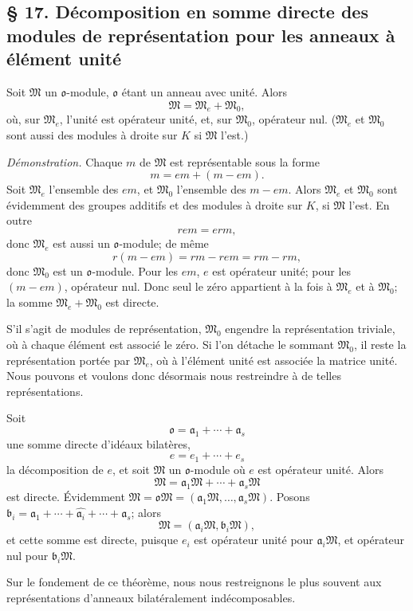 
\providecommand{\mo}{\mathfrak{o}}
\providecommand{\mM}{\mathfrak{M}}
\providecommand{\ma}{\mathfrak{a}}
\providecommand{\mb}{\mathfrak{b}}

\subsection*{\S{} 17. Décomposition en somme directe des modules de représentation pour les anneaux à élément unité}
Soit $\mM$ un $\mo$-module, $\mo$ étant un anneau avec unité. Alors
\[
        \mM=\mM_e+\mM_0,
\]
où, sur $\mM_e$, l'unité est opérateur unité, et, sur $\mM_0$, opérateur nul. ($\mM_e$ et $\mM_0$ sont aussi des modules à droite sur $K$ si $\mM$ l'est.)

\emph{Démonstration.} Chaque $m$ de $\mM$ est représentable sous la forme
\[
        m=em+(m-em).
\]
Soit $\mM_e$ l'ensemble des $em$, et $\mM_0$ l'ensemble des $m-em$. Alors $\mM_e$ et $\mM_0$ sont évidemment des groupes additifs et des modules à droite sur $K$, si $\mM$ l'est. En outre
\[
        r em=erm,
\]
donc $\mM_e$ est aussi un $\mo$-module; de même
\[
        r(m-em)=rm-rem=rm-rm,
\]
donc $\mM_0$ est un $\mo$-module. Pour les $em$, $e$ est opérateur unité; pour les $(m-em)$, opérateur nul. Donc seul le zéro appartient à la fois à $\mM_e$ et à $\mM_0$; la somme $\mM_e+\mM_0$ est directe.

S'il s'agit de modules de représentation, $\mM_0$ engendre la représentation triviale, où à chaque élément est associé le zéro. Si l'on détache le sommant $\mM_0$, il reste la représentation portée par $\mM_e$, où à l'élément unité est associée la matrice unité. Nous pouvons et voulons donc désormais nous restreindre à de telles représentations.

Soit
\[
        \mo=\ma_1+\cdots+\ma_s
\]
une somme directe d'idéaux bilatères,
\[
        e=e_1+\cdots+e_s
\]
la décomposition de $e$, et soit $\mM$ un $\mo$-module où $e$ est opérateur unité. Alors
\[
        \mM=\ma_1\mM+\cdots+\ma_s\mM
\]
est directe. Évidemment $\mM=\mo\mM=(\ma_1\mM,\ldots,\ma_s\mM)$. Posons $\mb_i=\ma_1+\cdots+\widehat{\ma_i}+\cdots+\ma_s$; alors
\[
        \mM=(\ma_i\mM,\mb_i\mM),
\]
et cette somme est directe, puisque $e_i$ est opérateur unité pour $\ma_i\mM$, et opérateur nul pour $\mb_i\mM$.

Sur le fondement de ce théorème, nous nous restreignons le plus souvent aux représentations d'anneaux bilatéralement indécomposables.

